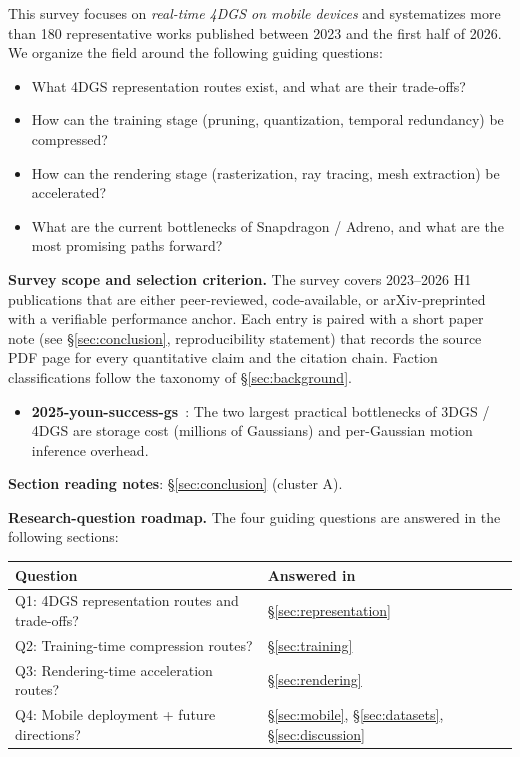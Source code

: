 This survey focuses on \emph{real-time 4DGS on mobile devices} and
systematizes more than 180 representative works published between 2023
and the first half of 2026. We organize the field around the following
guiding questions:
\begin{itemize}
  \item What 4DGS representation routes exist, and what are their
        trade-offs?
  \item How can the training stage (pruning, quantization, temporal
        redundancy) be compressed?
  \item How can the rendering stage (rasterization, ray tracing, mesh
        extraction) be accelerated?
  \item What are the current bottlenecks of Snapdragon / Adreno, and
        what are the most promising paths forward?
\end{itemize}

\noindent\textbf{Survey scope and selection criterion.} The
survey covers 2023--2026 H1 publications that are either
peer-reviewed, code-available, or arXiv-preprinted with a
verifiable performance anchor. Each entry is paired with a
short paper note (see \S\ref{sec:conclusion}, reproducibility
statement) that records the source PDF page for every
quantitative claim and the citation chain. Faction
classifications follow the taxonomy of \S\ref{sec:background}.

\bigskip
\begin{itemize}
\item \textbf{2025-youn-success-gs}~\cite{youn2025successgs}: The two
      largest practical bottlenecks of 3DGS / 4DGS are storage cost
      (millions of Gaussians) and per-Gaussian motion inference
      overhead.
\end{itemize}
\noindent\textbf{Section reading notes}:
\S\ref{sec:conclusion} (cluster A).

\bigskip
\noindent\textbf{Research-question roadmap.} The four guiding questions
are answered in the following sections:
\begin{center}
\begin{tabular}{ll}
\toprule
\textbf{Question} & \textbf{Answered in} \\
\midrule
Q1: 4DGS representation routes and trade-offs? & \S\ref{sec:representation} \\
Q2: Training-time compression routes? & \S\ref{sec:training} \\
Q3: Rendering-time acceleration routes? & \S\ref{sec:rendering} \\
Q4: Mobile deployment + future directions? & \S\ref{sec:mobile}, \S\ref{sec:datasets}, \S\ref{sec:discussion} \\
\bottomrule
\end{tabular}
\end{center}

